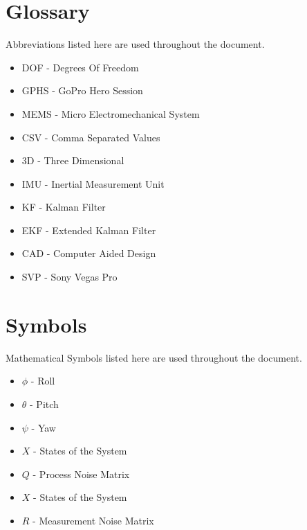 \chapter*{Glossary}

Abbreviations listed here are used throughout the document.

\begin{itemize}
\item DOF - Degrees Of Freedom
\item GPHS - GoPro Hero Session
\item MEMS - Micro Electromechanical System
\item CSV - Comma Separated Values
\item 3D - Three Dimensional
\item IMU - Inertial Measurement Unit
\item KF - Kalman Filter
\item EKF - Extended Kalman Filter
\item CAD - Computer Aided Design
\item SVP - Sony Vegas Pro
\end{itemize}



\newpage
{}
\chapter*{Symbols}

Mathematical Symbols listed here are used throughout the document.

\begin{itemize}
\item $\phi$ - Roll
\item $\theta$ - Pitch
\item $\psi$ - Yaw 
\item $X$ - States of the System
\item $Q$ - Process Noise Matrix
\item $X$ - States of the System
\item $R$ - Measurement Noise Matrix
\end{itemize}